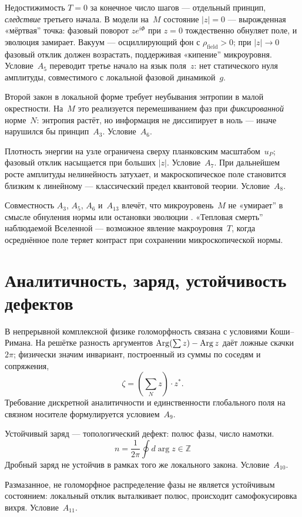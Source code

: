 Недостижимость $T=0$ за конечное число шагов --- отдельный принцип, \emph{следствие}
третьего начала.
В модели на~$M$ состояние $|z|=0$ --- вырожденная «мёртвая'' точка:
фазовый поворот $z e^{i\Phi}$ при $z=0$ тождественно обнуляет поле, и эволюция замирает.
Вакуум --- осциллирующий фон с $\rho_{\mathrm{field}}>0$; при $|z|\to 0$ фазовый отклик
должен возрастать, поддерживая «кипение'' микроуровня.
Условие~$A_5$ переводит третье начало на язык поля~$z$: нет статического нуля амплитуды,
совместимого с локальной фазовой динамикой~$g$.

Второй закон в локальной форме требует неубывания энтропии в малой окрестности.
На~$M$ это реализуется перемешиванием фаз при \emph{фиксированной} норме~$N$:
энтропия растёт, но информация не диссипирует в ноль --- иначе нарушился бы принцип~$A_3$.
Условие~$A_6$.

Плотность энергии на узле ограничена сверху планковским масштабом~$u_P$;
фазовый отклик насыщается при больших $|z|$.
Условие~$A_7$.
При дальнейшем росте амплитуды нелинейность затухает, и макроскопическое поле становится
близким к линейному --- классический предел квантовой теории.
Условие~$A_8$.

Совместность $A_3$, $A_5$, $A_6$ и~$A_{13}$ влечёт, что микроуровень~$M$ не «умирает''
в смысле обнуления нормы или остановки эволюции .
«Тепловая смерть'' наблюдаемой Вселенной --- возможное явление макроуровня~$T$,
когда осреднённое поле теряет контраст при сохранении микроскопической нормы.

\section{Аналитичность, заряд, устойчивость дефектов}

В непрерывной комплексной физике голоморфность связана с условиями Коши--Римана.
На решётке разность аргументов $\operatorname{Arg}(\sum z)-\operatorname{Arg} z$ даёт ложные скачки $2\pi$;
физически значим инвариант, построенный из суммы по соседям и сопряжения,
\[
\zeta=(\sum_N z)\cdot z^*.
\]
Требование дискретной аналитичности и единственности глобального поля на связном носителе
формулируется условием~$A_9$.

Устойчивый заряд --- топологический дефект: полюс фазы, число намотки.
\[
n=\frac{1}{2\pi}\oint d\arg z\in\mathbb{Z}
\]
Дробный заряд не устойчив в рамках того же локального закона.
Условие~$A_{10}$.

Размазанное, не голоморфное распределение фазы не является устойчивым состоянием:
локальный отклик выталкивает полюс, происходит самофокусировка вихря.
Условие~$A_{11}$.

